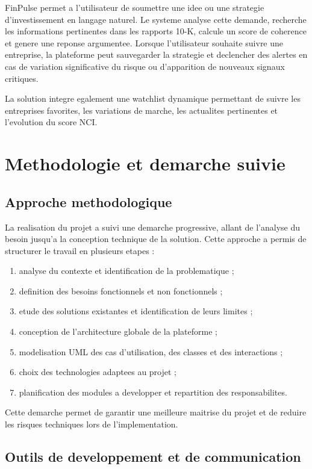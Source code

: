 FinPulse permet a l'utilisateur de soumettre une idee ou une strategie
d'investissement en langage naturel. Le systeme analyse cette demande, recherche les
informations pertinentes dans les rapports 10-K, calcule un score de coherence et
genere une reponse argumentee. Lorsque l'utilisateur souhaite suivre une entreprise,
la plateforme peut sauvegarder la strategie et declencher des alertes en cas de
variation significative du risque ou d'apparition de nouveaux signaux critiques.

La solution integre egalement une watchlist dynamique permettant de suivre les
entreprises favorites, les variations de marche, les actualites pertinentes et
l'evolution du score NCI.

\section{Methodologie et demarche suivie}

\subsection{Approche methodologique}

La realisation du projet a suivi une demarche progressive, allant de l'analyse du
besoin jusqu'a la conception technique de la solution. Cette approche a permis de
structurer le travail en plusieurs etapes :

\begin{enumerate}
    \item analyse du contexte et identification de la problematique ;
    \item definition des besoins fonctionnels et non fonctionnels ;
    \item etude des solutions existantes et identification de leurs limites ;
    \item conception de l'architecture globale de la plateforme ;
    \item modelisation UML des cas d'utilisation, des classes et des interactions ;
    \item choix des technologies adaptees au projet ;
    \item planification des modules a developper et repartition des responsabilites.
\end{enumerate}

Cette demarche permet de garantir une meilleure maitrise du projet et de reduire les
risques techniques lors de l'implementation.

\subsection{Outils de developpement et de communication}


